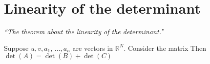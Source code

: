 \documentclass[12pt]{report}
\begin{document}
    \section{Linearity of the determinant}
    \textit{``The theorem about the linearity of the determinant.''} \vspace{3mm}
    \begin{theorem}
        Suppose \(u,v,a_1, \, \dots, a_n\) are vectors in \(\mathbb{R}^N\). Consider the matrix
        \sidebysidebyside{
            \[
                A = 
                \begin{gmatrix}[b]
                    a_1\\
                    \vdots\\
                    a_{r-1}\\
                    u + \lambda v\\
                    a_{r+1}\\
                    \vdots\\
                    a_n
                \end{gmatrix}
            \]
        }{
            \[
                B = 
                \begin{gmatrix}[b]
                    a_1\\
                    \vdots\\
                    a_{r-1}\\
                    u\\
                    a_{r+1}\\
                    \vdots\\
                    a_n
                \end{gmatrix}
            \]
        }{
            \[
                C = 
                \begin{gmatrix}[b]
                    a_1\\
                    \vdots\\
                    a_{r-1}\\
                    \lambda v\\
                    a_{r+1}\\
                    \vdots\\
                    a_n
                \end{gmatrix}
            \]
        }
        Then \(\det(A) = \det(B) + \det(C)\)
    \end{theorem}
\end{document}
